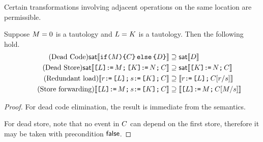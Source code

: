 Certain transformations involving adjacent operations on the same location
are permissible. 
 
\begin{lemma}
  Suppose $\aExp=0$ is a tautology and $\cExp=\dExp$ is a tautology.   Then the following hold.
  \begin{align*}
  \tag{Dead Code} 
  \fsat\sem{\IF{\aExp}\THEN\aCmd\ELSE\bCmd\FI} &\supseteq 
  \fsat\sem{\bCmd} \\
  \tag{Dead Store} 
  \fsat\sem{\REF{\cExp} \GETS \aExp \SEMI \REF{\dExp} \GETS \bExp \SEMI \aCmd} &\supseteq 
  \fsat\sem{\REF{\dExp} \GETS \bExp \SEMI \aCmd}\\    
  \tag{Redundant load}
  \sem{\aReg \GETS \REF{\cExp} \SEMI \bReg \GETS \REF{\dExp}  \SEMI \aCmd} &\supseteq
  \sem{\aReg \GETS \REF{\cExp} \SEMI \aCmd[\aReg/\bReg]} \\
  \tag{Store forwarding} 
  \sem{\REF{\cExp} \GETS \aExp \SEMI \bReg \GETS \REF{\dExp} \SEMI \aCmd} &\supseteq 
  \sem{\REF{\cExp} \GETS \aExp \SEMI \aCmd[\aExp/\bReg]}
\end{align*}
\begin{proof}
  For dead code elimination, the result is immediate from the semantics.
  
  For dead store, note that no event in $\aCmd$ can depend on the first store,
  therefore it may be taken with precondition $\FALSE$.
  

\end{proof}
\end{lemma}
